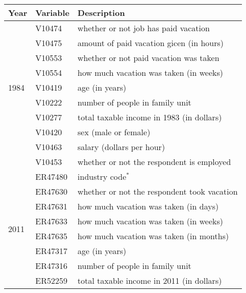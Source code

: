 \documentclass{article}
\begin{document}
    \setcounter{table}{0}
    \renewcommand{\thetable}{A.\arabic{table}}
    \setlength{\extrarowheight}{3pt}
    \begin{table}[h]
    \centering
    \hspace*{-1.5cm}
    \begin{tabular}{l|l|l}
      Year & Variable & Description \\ \hline \hline
      \multirow{9}{*}{1984}
        & V10474 & whether or not job has paid vacation      \\ \cline{2-3}
        & V10475 & amount of paid vacation gicen (in hours)  \\ \cline{2-3}
        & V10553 & whether or not paid vacation was taken    \\ \cline{2-3}
        & V10554 & how much vacation was taken (in weeks)    \\ \cline{2-3}
        & V10419 & age (in years)                            \\ \cline{2-3}
        & V10222 & number of people in family unit           \\ \cline{2-3}
        & V10277 & total taxable income in 1983 (in dollars) \\ \cline{2-3}
        & V10420 & sex (male or female)                      \\ \cline{2-3}
        & V10463 & salary (dollars per hour)                 \\ \cline{2-3}
        & V10453 & whether or not the respondent is employed \\ \hline
      \multirow{12}{*}{2011}
        & ER47480 & industry code$^*$                           \\ \cline{2-3}
        & ER47630 & whether or not the respondent took vacation \\ \cline{2-3}
        & ER47631 & how much vacation was taken (in days)       \\ \cline{2-3}
        & ER47633 & how much vacation was taken (in weeks)      \\ \cline{2-3}
        & ER47635 & how much vacation was taken (in months)     \\ \cline{2-3}
        & ER47317 & age (in years)                              \\ \cline{2-3}
        & ER47316 & number of people in family unit             \\ \cline{2-3}
        & ER52259 & total taxable income in 2011 (in dollars)   \\ \cline{2-3}

\end{tabular}
\end{table}
\end{document}
